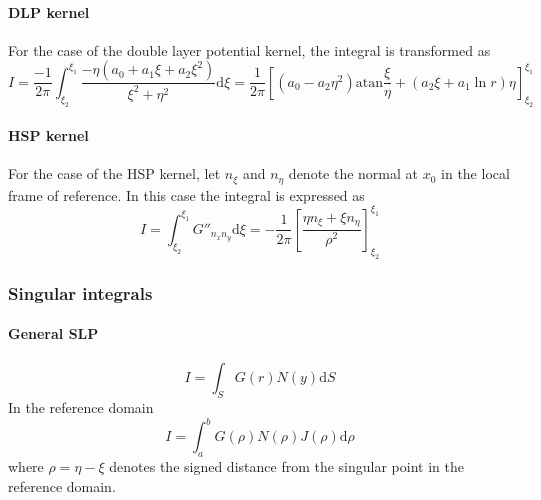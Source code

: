\documentclass[a4paper,11pt]{article}
\newcommand{\td}{\mathrm{d}}
\newcommand{\atan}{\mathrm{atan}}
\begin{document}
\paragraph{DLP kernel}

For the case of the double layer potential kernel, the integral is transformed as
%
\begin{equation}
I = \frac{-1}{2\pi} \int_{\xi_2}^{\xi_1} \frac{-\eta \left(a_0 + a_1 \xi + a_2 \xi^2 \right)}{\xi^2+\eta^2}\td \xi
= \frac{1}{2\pi} \left[
\left( a_0 - a_2 \eta^2\right) \atan \frac{\xi}{\eta} + \left(a_2 \xi + a_1 \ln r\right) \eta
\right]_{\xi_2}^{\xi_1}
\end{equation}

\paragraph{HSP kernel}

For the case of the HSP kernel, let $n_{\xi}$ and $n_{\eta}$ denote the normal at $x_0$ in the local frame of reference. In this case the integral is expressed as
%
\begin{equation}
I
= \int_{\xi_2}^{\xi_1} G''_{n_x n_y} \td \xi
= -\frac{1}{2\pi} \left[ \frac{ \eta n_{\xi} + \xi n_{\eta} }{\rho^2} \right]_{\xi_2}^{\xi_1}
\end{equation}

\subsubsection{Singular integrals}

\paragraph{General SLP}

\begin{equation}
	I = \int_S G(r) N(y) \td S
\end{equation}
%
In the reference domain
%
\begin{equation}
	I = \int_a^b G(\rho) N(\rho) J(\rho) \td \rho
\end{equation}
%
where $\rho = \eta - \xi$ denotes the signed distance from the singular point in the reference domain.
\end{document}
